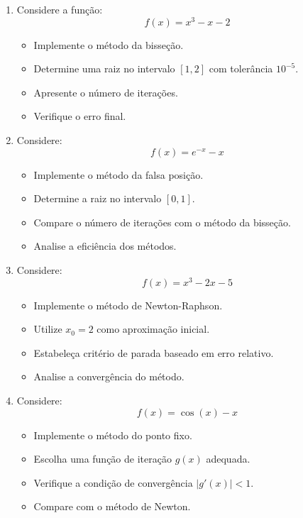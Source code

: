 \begin{enumerate}
\section{Soluções de equações não lineares} \label{sec:SolSistNaoLineares}

\item Considere a função:
\[
f(x) = x^3 - x - 2
\]

\begin{itemize}
    \item Implemente o método da bisseção.
    \item Determine uma raiz no intervalo $[1,2]$ com tolerância $10^{-5}$.
    \item Apresente o número de iterações.
    \item Verifique o erro final.
\end{itemize}

\item Considere:
\[
f(x) = e^{-x} - x
\]

\begin{itemize}
    \item Implemente o método da falsa posição.
    \item Determine a raiz no intervalo $[0,1]$.
    \item Compare o número de iterações com o método da bisseção.
    \item Analise a eficiência dos métodos.
\end{itemize}

\item Considere:
\[
f(x) = x^3 - 2x - 5
\]

\begin{itemize}
    \item Implemente o método de Newton-Raphson.
    \item Utilize $x_0 = 2$ como aproximação inicial.
    \item Estabeleça critério de parada baseado em erro relativo.
    \item Analise a convergência do método.
\end{itemize}

\item Considere:
\[
f(x) = \cos(x) - x
\]

\begin{itemize}
    \item Implemente o método do ponto fixo.
    \item Escolha uma função de iteração $g(x)$ adequada.
    \item Verifique a condição de convergência $|g'(x)| < 1$.
    \item Compare com o método de Newton.
\end{itemize}


\end{enumerate}
